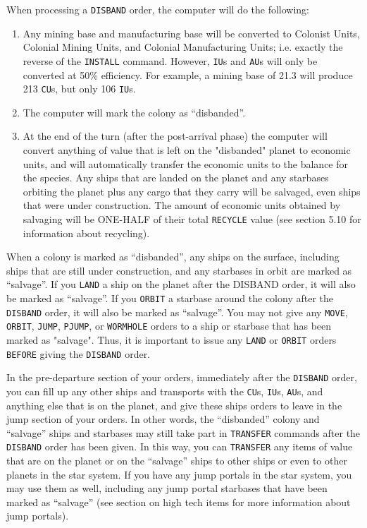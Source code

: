 \documentclass[10pt,titlepage]{article}
\begin{document}
When processing a \texttt{DISBAND} order, the computer will do the following:
\begin{enumerate}
	\item Any mining base and manufacturing base will be converted
	to Colonist Units, Colonial Mining Units, and Colonial
	Manufacturing Units; i.e. exactly the reverse of the \texttt{INSTALL}
	command.  However, \texttt{IU}s and \texttt{AU}s will only be converted at 50\%
	efficiency.  For example, a mining base of 21.3 will produce
	213 \texttt{CU}s, but only 106 \texttt{IU}s.

	\item The computer will mark the colony as ``disbanded''.

	\item At the end of the turn (after the post-arrival phase) the
	computer will convert anything of value that is left on the
	"disbanded" planet to economic units, and will automatically
	transfer the economic units to the balance for the species.  Any
	ships that are landed on the planet and any starbases orbiting
	the planet plus any cargo that they carry will be salvaged, even
	ships that were under construction.  The amount of economic units
	obtained by salvaging will be ONE-HALF of their total \texttt{RECYCLE}
	value (see section 5.10 for information about recycling).
\end{enumerate}
When a colony is marked as ``disbanded'', any ships on the surface, including
ships that are still under construction, and any starbases in orbit are marked
as ``salvage''.  If you \texttt{LAND} a ship on the planet after the DISBAND order, it
will also be marked as ``salvage''.  If you \texttt{ORBIT} a starbase around the colony
after the \texttt{DISBAND} order, it will also be marked as ``salvage''.  You may not give
any \texttt{MOVE}, \texttt{ORBIT}, \texttt{JUMP}, \texttt{PJUMP}, or \texttt{WORMHOLE} orders to a ship or starbase that has
been marked as "salvage".  Thus, it is important to issue any \texttt{LAND} or \texttt{ORBIT}
orders \texttt{BEFORE} giving the \texttt{DISBAND} order.

In the pre-departure section of your orders, immediately after the \texttt{DISBAND}
order, you can fill up any other ships and transports with the \texttt{CU}s, \texttt{IU}s, \texttt{AU}s,
and anything else that is on the planet, and give these ships orders to leave
in the jump section of your orders.  In other words, the ``disbanded'' colony and
``salvage'' ships and starbases may still take part in \texttt{TRANSFER} commands after
the \texttt{DISBAND} order has been given.  In this way, you can \texttt{TRANSFER} any items of
value that are on the planet or on the ``salvage'' ships to other ships or even
to other planets in the star system.  If you have any jump portals in the star
system, you may use them as well, including any jump portal starbases that have
been marked as ``salvage'' (see section on high tech items for more information
about jump portals).
\end{document}
